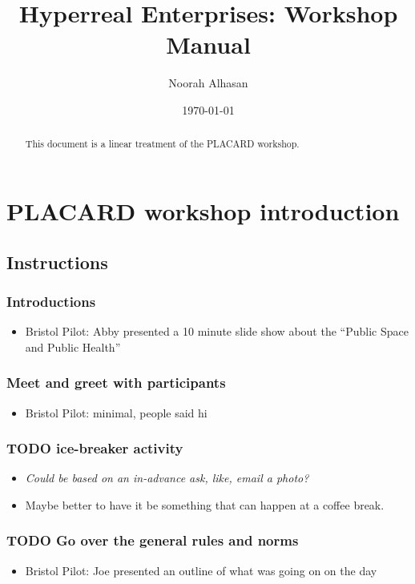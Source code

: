 \documentclass[11pt]{article}
\author{Noorah Alhasan}
\date{\today}
\title{Hyperreal Enterprises: Workshop Manual}
\begin{document}
\maketitle
\begin{abstract}
\noindent This document is a linear treatment of the PLACARD workshop.
\end{abstract}

\setcounter{tocdepth}{2}
\tableofcontents
\section{PLACARD workshop introduction}
\label{b7b42aa2-c57c-4bcc-bc45-be9b63972be7}
\subsection{Instructions}
\label{sec:orgb90d76f}

\subsubsection{Introductions}
\label{sec:orgfc4c538}
\begin{itemize}
\item Bristol Pilot: Abby presented a 10 minute slide show about the ``Public Space and Public Health''
\end{itemize}
\subsubsection{Meet and greet with participants}
\label{sec:org1cc3ed0}
\begin{itemize}
\item Bristol Pilot: minimal, people said hi
\end{itemize}
\subsubsection{{\bfseries\sffamily TODO} ice-breaker activity}
\label{sec:org84be6f0}
\begin{itemize}
\item \emph{Could be based on an in-advance ask, like, email a photo?}
\item Maybe better to have it be something that can happen at a coffee break.
\end{itemize}
\subsubsection{{\bfseries\sffamily TODO} Go over the general rules and norms}
\label{sec:org05fe842}
\begin{itemize}
\item Bristol Pilot: Joe presented an outline of what was going on on the day
\end{itemize}
\end{document}
